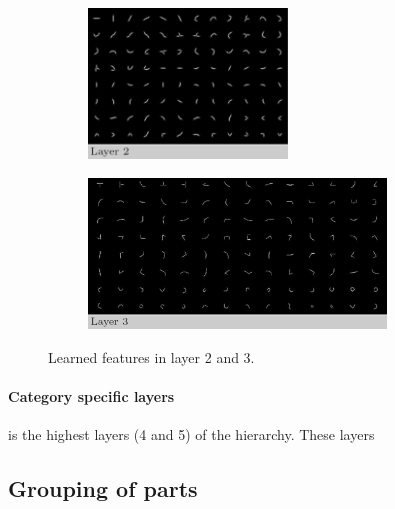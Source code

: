 \begin{figure}[h!] %
	\centering
\begin{subfigure}[b]{0.3\textwidth}
	\includegraphics[height=4cm]{graphics/layer2_features}
\end{subfigure}
\hspace{1cm}
\begin{subfigure}[b]{0.3\textwidth}
	\includegraphics[height=4cm]{graphics/layer3_features}
\end{subfigure}

\label{fig:layer2+3}
\caption{Learned features in layer 2 and 3.}
\end{figure}

\paragraph*{Category specific layers} is the highest layers (4 and 5) of the hierarchy. These layers 


\subsection{Grouping of parts}
\label{sec:grouping_of_parts}

